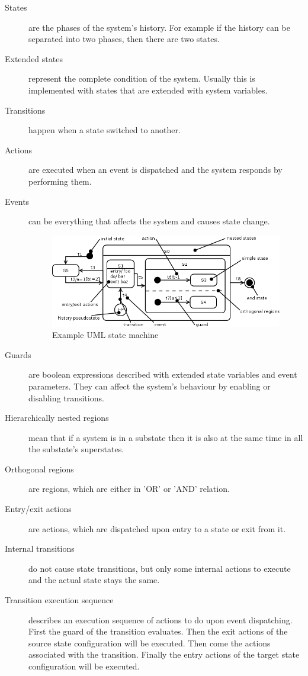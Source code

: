 \begin{description}
	\item[States] are the phases of the system's history. For example if the history can be separated into two phases, then there are two states. 
	\item[Extended states] represent the complete condition of the system. Usually this is implemented with states that are extended with system variables.
	\item[Transitions] happen when a state switched to another.
	\item[Actions] are executed when an event is dispatched and the system responds by performing them.
	\item[Events] can be everything that affects the system and causes state change.
	
\begin{figure}[htp]
\centering
\includegraphics[scale=0.5]{figures/mbt_smexample}
\caption{Example UML state machine}
\label{fig:mbt_smexample}
\end{figure}
	
	\item[Guards] are boolean expressions described with extended state variables and event parameters. They can affect the system's behaviour by enabling or disabling transitions.
	\item[Hierarchically nested regions] mean that if a system is in a substate then it is also at the same time in all the substate's superstates.
	\item[Orthogonal regions] are regions, which are either in 'OR'  or 'AND' relation.
	\item[Entry/exit actions] are actions, which are dispatched upon entry to a state or exit from it.
	\item[Internal transitions] do not cause state transitions, but only some internal actions to execute and the actual state stays the same.
	\item[Transition execution sequence] describes an execution sequence of actions to do upon event dispatching. First the guard of the transition evaluates. Then the exit actions of the source state configuration will be executed. Then come the actions associated with the transition. Finally the entry actions of the target state configuration will be executed.
\end{description}

